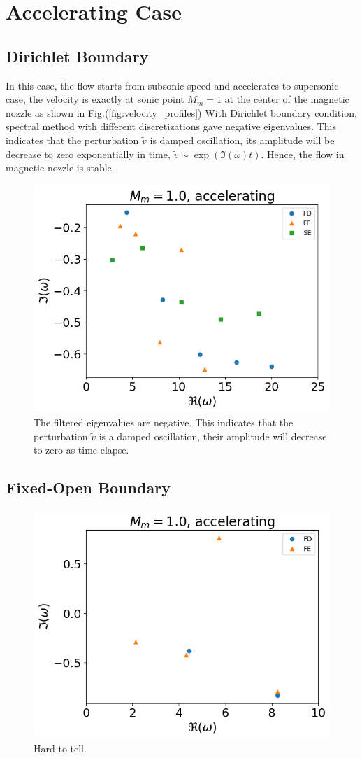 \section{Accelerating Case}
\subsection{Dirichlet Boundary}
In this case, the flow starts from subsonic speed and accelerates to supersonic case, the velocity is exactly at sonic point $M_m=1$ at the center of the magnetic nozzle as shown in Fig.(\ref{fig:velocity_profiles})
With Dirichlet boundary condition, spectral method with different discretizations gave negative eigenvalues. This indicates that the perturbation $\tilde{v}$ is damped oscillation, its amplitude will be decrease to zero exponentially in time, $\tilde{v} \sim \exp(\Im(\omega)t)$. Hence, the flow in magnetic nozzle is stable.
\begin{figure} [H]
	\centering
	\includegraphics[width=0.7\linewidth]{img/numerical_experiments/fixed_fixed/accelerating_v}
	\caption{The filtered eigenvalues are negative. This indicates that the perturbation $\tilde{v}$ is a damped oscillation, their amplitude will decrease to zero as time elapse.}
	\label{fig:accelerating_v_dirichlet}
\end{figure}

\subsection{Fixed-Open Boundary}
\begin{figure} [H]
	\centering
	\includegraphics[width=0.7\linewidth]{img/numerical_experiments/fixed_open/accelerating_v}
	\caption{Hard to tell.}
	\label{fig:accelerating_v_fixed_open}
\end{figure}


